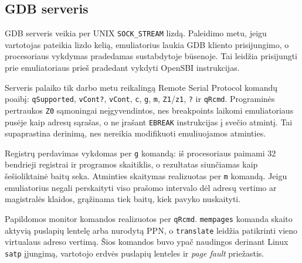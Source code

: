 \subsection{GDB serveris}
\label{sec:gdb-serveris}

GDB serveris veikia per UNIX \texttt{SOCK\_STREAM} lizdą. Paleidimo metu, jeigu vartotojas pateikia lizdo kelią, emuliatorius laukia GDB kliento prisijungimo, o procesoriaus vykdymas pradedamas sustabdytoje būsenoje. Tai leidžia prisijungti prie emuliatoriaus prieš pradedant vykdyti OpenSBI instrukcijas.

Serveris palaiko tik darbo metu reikalingą Remote Serial Protocol komandų poaibį: \texttt{qSupported}, \texttt{vCont?}, \texttt{vCont}, \texttt{c}, \texttt{g}, \texttt{m}, \texttt{Z1}/\texttt{z1}, \texttt{?} ir \texttt{qRcmd}. Programinės pertraukos \texttt{Z0} sąmoningai neįgyvendintos, nes breakpoints laikomi emuliatoriaus pusėje kaip adresų sąrašas, o ne įrašant \texttt{EBREAK} instrukcijas į svečio atmintį. Tai supaprastina derinimą, nes nereikia modifikuoti emuliuojamos atminties.

Registrų perdavimas vykdomas per \texttt{g} komandą: iš procesoriaus paimami 32 bendrieji registrai ir programos skaitiklis, o rezultatas siunčiamas kaip šešioliktainė baitų seka. Atminties skaitymas realizuotas per \texttt{m} komandą. Jeigu emuliatorius negali perskaityti viso prašomo intervalo dėl adresų vertimo ar magistralės klaidos, grąžinama tiek baitų, kiek pavyko nuskaityti.

Papildomos monitor komandos realizuotos per \texttt{qRcmd}. \texttt{mempages} komanda skaito aktyvią puslapių lentelę arba nurodytą PPN, o \texttt{translate} leidžia patikrinti vieno virtualaus adreso vertimą. Šios komandos buvo ypač naudingos derinant Linux \texttt{satp} įjungimą, vartotojo erdvės puslapių lenteles ir \textit{page fault} priežastis.

